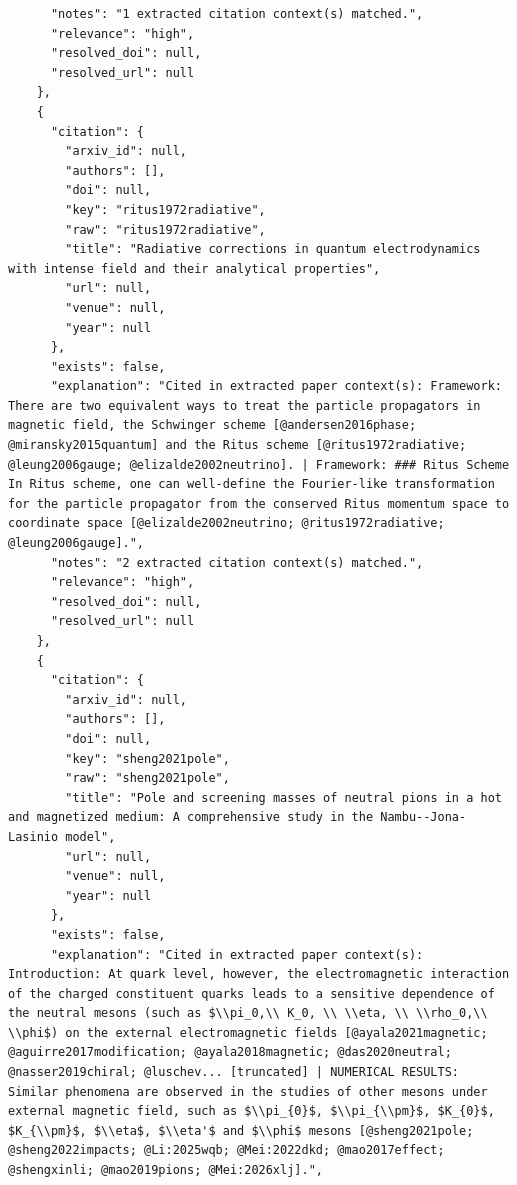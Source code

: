 \documentclass[11pt]{article}
\begin{document}
\begin{verbatim}
      "notes": "1 extracted citation context(s) matched.",
      "relevance": "high",
      "resolved_doi": null,
      "resolved_url": null
    },
    {
      "citation": {
        "arxiv_id": null,
        "authors": [],
        "doi": null,
        "key": "ritus1972radiative",
        "raw": "ritus1972radiative",
        "title": "Radiative corrections in quantum electrodynamics with intense field and their analytical properties",
        "url": null,
        "venue": null,
        "year": null
      },
      "exists": false,
      "explanation": "Cited in extracted paper context(s): Framework: There are two equivalent ways to treat the particle propagators in magnetic field, the Schwinger scheme [@andersen2016phase; @miransky2015quantum] and the Ritus scheme [@ritus1972radiative; @leung2006gauge; @elizalde2002neutrino]. | Framework: ### Ritus Scheme In Ritus scheme, one can well-define the Fourier-like transformation for the particle propagator from the conserved Ritus momentum space to coordinate space [@elizalde2002neutrino; @ritus1972radiative; @leung2006gauge].",
      "notes": "2 extracted citation context(s) matched.",
      "relevance": "high",
      "resolved_doi": null,
      "resolved_url": null
    },
    {
      "citation": {
        "arxiv_id": null,
        "authors": [],
        "doi": null,
        "key": "sheng2021pole",
        "raw": "sheng2021pole",
        "title": "Pole and screening masses of neutral pions in a hot and magnetized medium: A comprehensive study in the Nambu--Jona-Lasinio model",
        "url": null,
        "venue": null,
        "year": null
      },
      "exists": false,
      "explanation": "Cited in extracted paper context(s): Introduction: At quark level, however, the electromagnetic interaction of the charged constituent quarks leads to a sensitive dependence of the neutral mesons (such as $\\pi_0,\\ K_0, \\ \\eta, \\ \\rho_0,\\ \\phi$) on the external electromagnetic fields [@ayala2021magnetic; @aguirre2017modification; @ayala2018magnetic; @das2020neutral; @nasser2019chiral; @luschev... [truncated] | NUMERICAL RESULTS: Similar phenomena are observed in the studies of other mesons under external magnetic field, such as $\\pi_{0}$, $\\pi_{\\pm}$, $K_{0}$, $K_{\\pm}$, $\\eta$, $\\eta'$ and $\\phi$ mesons [@sheng2021pole; @sheng2022impacts; @Li:2025wqb; @Mei:2022dkd; @mao2017effect; @shengxinli; @mao2019pions; @Mei:2026xlj].",

\end{verbatim}
\end{document}

